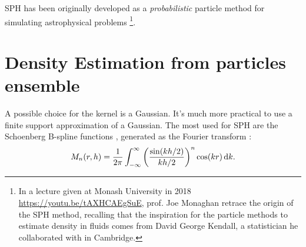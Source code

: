 SPH has been originally developed as a \emph{probabilistic} particle method for simulating astrophysical problems \citep{Lucy1977, Gingold1977}\footnote{In a lecture given at Monash University in 2018 \url{https://youtu.be/tAXHCAEgSuE}, prof. Joe Monaghan retrace the origin of the SPH method, recalling that the inspiration for the particle methods to estimate density in fluids comes from David George Kendall, a statistician he collaborated with in Cambridge.}.







\section{Density Estimation from particles ensemble}
A possible choice for the kernel is a Gaussian.
It's much more practical to use a finite support approximation of a Gaussian.
The most used for SPH are the Schoenberg  B-spline functions \citep{Schoenberg1988}, generated as the Fourier transform \citep{Price2012}:
\begin{equation}
M_n(r, h) = \frac{1}{2\pi}\int_{-\infty}^{\infty}{\left(\frac{\sin(kh/2)}{kh/2}\right)^n\cos(kr)\operatorname{d}\!{k}}.
\end{equation}

